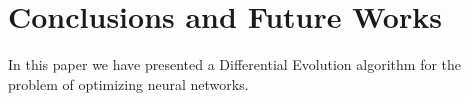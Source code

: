 \section{Conclusions and Future Works} \label{conclusions}

In this paper we have presented a Differential Evolution algorithm for the problem of optimizing neural networks.
